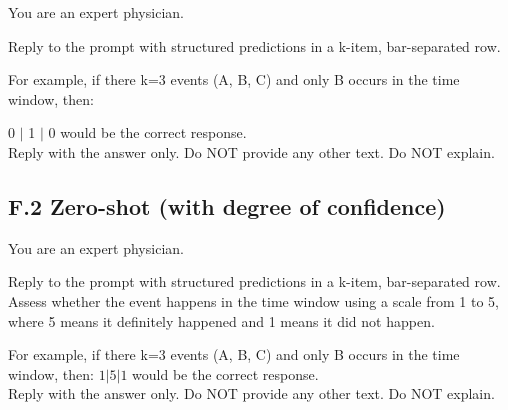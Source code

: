 \begin{tcolorbox}[colback=gray!5, colframe=gray!100, title=Prompt, boxrule=2pt]

{You are an expert physician.}

{Reply to the prompt with structured predictions in a k-item, bar-separated row.

For example, if there k=3 events (A, B, C) and only B occurs in the time window, then:}
{0 $\mid$ 1 $\mid$  0
would be the correct response. \\ 

Reply with the answer only. Do NOT provide any other text. Do NOT explain.}

\end{tcolorbox}

\subsection{F.2 \quad Zero-shot (with degree of confidence)}

\begin{tcolorbox}[colback=gray!5, colframe=gray!100, title=Prompt, boxrule=2pt]
{You are an expert physician.}

{Reply to the prompt with structured predictions in a k-item, bar-separated row.
Assess whether the event happens in the time window using a scale from 1 to 5, where 5 means it definitely happened and 1 means it did not happen.

For example, if there k=3 events (A, B, C) and only B occurs in the time window, then:
$1 | 5 | 1$
would be the correct response. \\

Reply with the answer only. Do NOT provide any other text. Do NOT explain.}
\end{tcolorbox}

